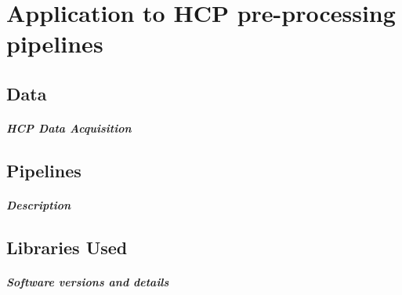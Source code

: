 \chapter{Application to HCP pre-processing pipelines}

\section{Data}
\paragraph{HCP Data Acquisition}

\section{Pipelines}
\paragraph{Description}

\section{Libraries Used}
\paragraph{Software versions and details}
